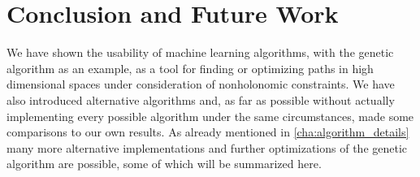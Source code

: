 \chapter{Conclusion and Future Work}
\label{cha:conclusion}

We have shown the usability of machine learning algorithms, with the genetic algorithm as an example, as a tool for finding or optimizing paths in high dimensional spaces under consideration of nonholonomic constraints. We have also introduced alternative algorithms and, as far as possible without actually implementing every possible algorithm under the same circumstances, made some comparisons to our own results. 
As already mentioned in \ref{cha:algorithm_details} many more alternative implementations and further optimizations of the genetic algorithm are possible, some of which will be summarized here.

